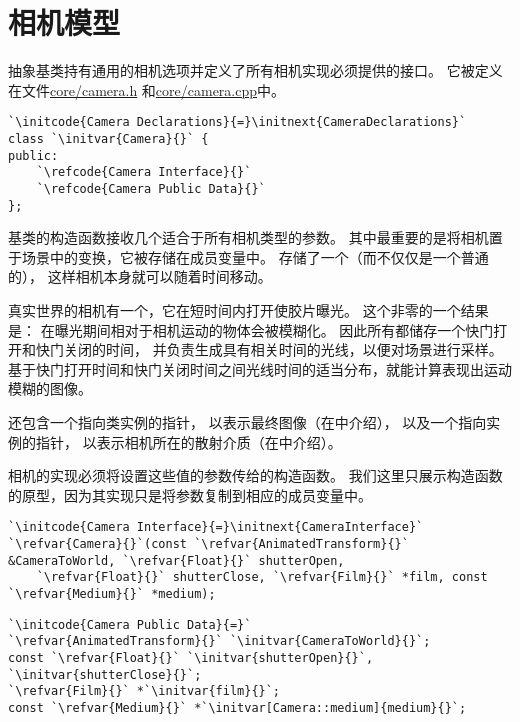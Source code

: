 \section{相机模型}\label{sec:相机模型}
抽象基类持有通用的相机选项并定义了所有相机实现必须提供的接口。
它被定义在文件\href{https://github.com/mmp/pbrt-v3/tree/master/src/core/camera.h}{\ttfamily core/camera.h}
和\href{https://github.com/mmp/pbrt-v3/blob/master/src/core/camera.cpp}{\ttfamily core/camera.cpp}中。
\begin{lstlisting}
`\initcode{Camera Declarations}{=}\initnext{CameraDeclarations}`
class `\initvar{Camera}{}` {
public:
    `\refcode{Camera Interface}{}`
    `\refcode{Camera Public Data}{}`
};
\end{lstlisting}

基类的构造函数接收几个适合于所有相机类型的参数。
其中最重要的是将相机置于场景中的变换，它被存储在成员变量中。
存储了一个（而不仅仅是一个普通的），
这样相机本身就可以随着时间移动。

真实世界的相机有一个，它在短时间内打开使胶片曝光。
这个非零的一个结果是：
在曝光期间相对于相机运动的物体会被模糊化。
因此所有都储存一个快门打开和快门关闭的时间，
并负责生成具有相关时间的光线，以便对场景进行采样。
基于快门打开时间和快门关闭时间之间光线时间的适当分布，就能计算表现出运动模糊的图像。

还包含一个指向类实例的指针，
以表示最终图像（在中介绍），
以及一个指向实例的指针，
以表示相机所在的散射介质（在中介绍）。

相机的实现必须将设置这些值的参数传给的构造函数。
我们这里只展示构造函数的原型，因为其实现只是将参数复制到相应的成员变量中。
\begin{lstlisting}
`\initcode{Camera Interface}{=}\initnext{CameraInterface}`
`\refvar{Camera}{}`(const `\refvar{AnimatedTransform}{}` &CameraToWorld, `\refvar{Float}{}` shutterOpen,
    `\refvar{Float}{}` shutterClose, `\refvar{Film}{}` *film, const `\refvar{Medium}{}` *medium);
\end{lstlisting}
\begin{lstlisting}
`\initcode{Camera Public Data}{=}`
`\refvar{AnimatedTransform}{}` `\initvar{CameraToWorld}{}`;
const `\refvar{Float}{}` `\initvar{shutterOpen}{}`, `\initvar{shutterClose}{}`;
`\refvar{Film}{}` *`\initvar{film}{}`;
const `\refvar{Medium}{}` *`\initvar[Camera::medium]{medium}{}`;
\end{lstlisting}

